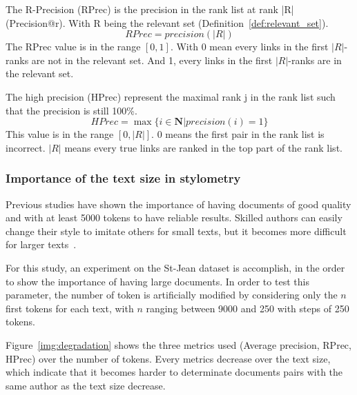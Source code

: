 \begin{definition}
  The R-Precision (RPrec) is the precision in the rank list at rank |R| (Precision@r).
  With R being the relevant set (Definition~\ref{def:relevant_set}).
  \begin{equation}
    RPrec = precision(|R|)
  \end{equation}
  The RPrec value is in the range $\left[0, 1\right]$.
  With 0 mean every links in the first $|R|$-ranks are not in the relevant set.
  And 1, every links in the first $|R|$-ranks are in the relevant set.
\end{definition}

\begin{definition}
  The high precision (HPrec) represent the maximal rank j in the rank list such that the precision is still 100\%.
  \begin{equation}
    HPrec = \max\{i \in \mathbf{N} | precision(i) = 1\}
  \end{equation}
  This value is in the range $\left[0, |R|\right]$.
  $0$ means the first pair in the rank list is incorrect.
  $|R|$ means every true links are ranked in the top part of the rank list.
\end{definition}

\subsubsection{Importance of the text size in stylometry}

Previous studies have shown the importance of having documents of good quality and with at least 5000 tokens to have reliable results.
Skilled authors can easily change their style to imitate others for small texts, but it becomes more difficult for larger texts~\cite{savoy_stylo}.

For this study, an experiment on the St-Jean dataset is accomplish, in the order to show the importance of having large documents.
In order to test this parameter, the number of token is artificially modified by considering only the $n$ first tokens for each text, with $n$ ranging between 9000 and 250 with steps of 250 tokens.

Figure~\ref{img:degradation} shows the three metrics used (Average precision, RPrec, HPrec) over the number of tokens.
Every metrics decrease over the text size, which indicate that it becomes harder to determinate documents pairs with the same author as the text size decrease.

